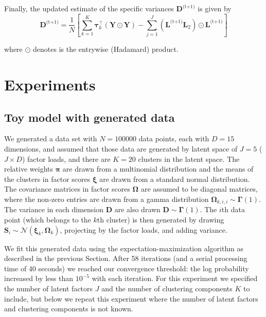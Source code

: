 \documentclass[twocolumn]{aastex61}
\newcommand{\vect}[1]{\boldsymbol{\mathbf{#1}}}
\renewcommand{\vec}[1]{\vect{#1}}
\newcommand{\weight}{\pi}
\newcommand{\data}{\textbf{Y}}
\newcommand{\vecdata}{\vec\data}
\newcommand{\nextstep}{^\textrm{(t+1)}}
\newcommand{\transpose}{^\intercal}
\newcommand{\factorloads}{\textbf{L}}
\newcommand{\factorscores}{\textbf{S}}
\newcommand{\specificvariance}{\vec{D}}
\newcommand{\scoremeans}{\vec\xi}
\newcommand{\scorecovs}{\vec\Omega}
\begin{document}
Finally, the updated estimate of the specific variances $\specificvariance\nextstep$ is given
by
\begin{equation}
	\specificvariance\nextstep = \frac{1}{N}\left[\sum^{K}_{k=1}\vec\tau_k\transpose\left(\vecdata\odot\vecdata\right) - \sum_{j=1}^{J}\left(\factorloads\nextstep\factorloads_2\right)\odot\factorloads\nextstep\right]
\end{equation}

\noindent{}where $\odot$ denotes is the entrywise (Hadamard) product.


\section{Experiments} \label{sec:experiments}

\subsection{Toy model with generated data} \label{sec:experiment-toy-model}

We generated a data set with ${N = 100000}$ data points, each with
$D = 15$ dimensions, and assumed that those data are generated by
latent space of $J = 5$ ($J \times D$) factor loads, and there are $K = 20$
clusters in the latent space. The relative weights $\vec\weight$
are drawn from a multinomial distribution and the means of the clusters
in factor scores $\scoremeans$ are drawn from a standard normal
distribution. The covariance matrices in factor scores $\scorecovs$ are assumed to be diagonal matrices, where the non-zero entries are drawn from a gamma distribution $\scorecovs_{k,i,i} \sim \vec\Gamma\left(1\right)$. The variance in 
each dimension $\specificvariance$ are also drawn $\specificvariance \sim \vec\Gamma\left(1\right)$.
The $i$th data point (which belongs to the $k$th cluster) is then
generated by drawing $\factorscores_{i} \sim \mathcal{N}(\scoremeans_k,\scorecovs_k)$, projecting by the factor loads, and adding variance.

We fit this generated data using the expectation-maximization algorithm
as described in the previous Section. After 58 iterations
(and a serial processing time of 40 seconds) we
reached our convergence threshold: the log probability increased by
less than $10^{-5}$ with each iteration. For this experiment we specified
the number of latent factors $J$ and the number of clustering components
$K$ to include, but below we repeat this experiment where the number
of latent factors and clustering components is not known.
\end{document}

